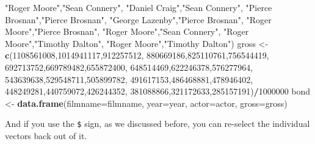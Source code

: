 \documentclass[
]{book}
\newenvironment{Shaded}{\begin{snugshade}}{\end{snugshade}}
\newcommand{\DataTypeTok}[1]{\textcolor[rgb]{0.13,0.29,0.53}{#1}}
\newcommand{\DecValTok}[1]{\textcolor[rgb]{0.00,0.00,0.81}{#1}}
\newcommand{\KeywordTok}[1]{\textcolor[rgb]{0.13,0.29,0.53}{\textbf{#1}}}
\newcommand{\NormalTok}[1]{#1}
\newcommand{\OperatorTok}[1]{\textcolor[rgb]{0.81,0.36,0.00}{\textbf{#1}}}
\newcommand{\StringTok}[1]{\textcolor[rgb]{0.31,0.60,0.02}{#1}}
\begin{document}
\begin{Shaded}
\begin{Highlighting}[]
           \StringTok{"Roger Moore"}\NormalTok{,}\StringTok{"Sean Connery"}\NormalTok{,}
           \StringTok{"Daniel Craig"}\NormalTok{,}\StringTok{"Sean Connery"}\NormalTok{,}
           \StringTok{"Pierce Brosnan"}\NormalTok{,}\StringTok{"Pierce Brosnan"}\NormalTok{,}
           \StringTok{"George Lazenby"}\NormalTok{,}\StringTok{"Pierce Brosnan"}\NormalTok{,}
           \StringTok{"Roger Moore"}\NormalTok{,}\StringTok{"Pierce Brosnan"}\NormalTok{,}
           \StringTok{"Roger Moore"}\NormalTok{,}\StringTok{"Sean Connery"}\NormalTok{,}
           \StringTok{"Roger Moore"}\NormalTok{,}\StringTok{"Timothy Dalton"}\NormalTok{,}
           \StringTok{"Roger Moore"}\NormalTok{,}\StringTok{"Timothy Dalton"}\NormalTok{)}
\NormalTok{gross <-}\StringTok{ }\KeywordTok{c}\NormalTok{(}\DecValTok{1108561008}\NormalTok{,}\DecValTok{1014941117}\NormalTok{,}\DecValTok{912257512}\NormalTok{,}
           \DecValTok{880669186}\NormalTok{,}\DecValTok{825110761}\NormalTok{,}\DecValTok{756544419}\NormalTok{,}
           \DecValTok{692713752}\NormalTok{,}\DecValTok{669789482}\NormalTok{,}\DecValTok{655872400}\NormalTok{,}
           \DecValTok{648514469}\NormalTok{,}\DecValTok{622246378}\NormalTok{,}\DecValTok{576277964}\NormalTok{,}
           \DecValTok{543639638}\NormalTok{,}\DecValTok{529548711}\NormalTok{,}\DecValTok{505899782}\NormalTok{,}
           \DecValTok{491617153}\NormalTok{,}\DecValTok{486468881}\NormalTok{,}\DecValTok{478946402}\NormalTok{,}
           \DecValTok{448249281}\NormalTok{,}\DecValTok{440759072}\NormalTok{,}\DecValTok{426244352}\NormalTok{,}
           \DecValTok{381088866}\NormalTok{,}\DecValTok{321172633}\NormalTok{,}\DecValTok{285157191}\NormalTok{)}\OperatorTok{/}\DecValTok{1000000}
\NormalTok{bond <-}\StringTok{ }\KeywordTok{data.frame}\NormalTok{(}\DataTypeTok{filmname=}\NormalTok{filmname,}
                   \DataTypeTok{year=}\NormalTok{year,}
                   \DataTypeTok{actor=}\NormalTok{actor,}
                   \DataTypeTok{gross=}\NormalTok{gross)}
\end{Highlighting}
\end{Shaded}

And if you use the \texttt{\$} sign, as we discussed before, you can re-select the individual vectors back out of it.

\begin{Shaded}
\end{Shaded}
\end{document}
